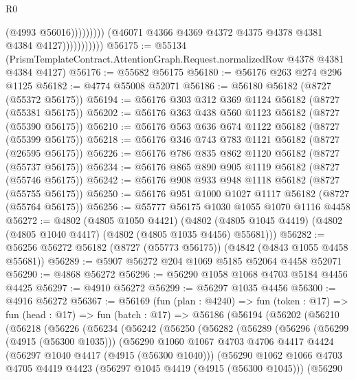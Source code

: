 \begin{lexlean}{R0}
\begin{coremodule}
                                        (@4993 @56016)))))))))
                        (@46071 @4366 @4369 @4372 @4375 @4378 @4381 @4384 @4127)))))))))))
@56175 := @55134
    (PrismTemplateContract.AttentionGraph.Request.normalizedRow @4378 @4381 @4384 @4127)
@56176 := @55682 @56175
@56180 := @56176 @263 @274 @296 @1125
@56182 := @4774 @55008 @52071
@56186 := @56180 @56182 (@8727 (@55372 @56175))
@56194 := @56176 @303 @312 @369 @1124 @56182 (@8727 (@55381 @56175))
@56202 := @56176 @363 @438 @560 @1123 @56182 (@8727 (@55390 @56175))
@56210 := @56176 @563 @636 @674 @1122 @56182 (@8727 (@55399 @56175))
@56218 := @56176 @346 @743 @783 @1121 @56182 (@8727 (@26595 @56175))
@56226 := @56176 @786 @835 @862 @1120 @56182 (@8727 (@55737 @56175))
@56234 := @56176 @865 @890 @905 @1119 @56182 (@8727 (@55746 @56175))
@56242 := @56176 @908 @933 @948 @1118 @56182 (@8727 (@55755 @56175))
@56250 := @56176 @951 @1000 @1027 @1117 @56182 (@8727 (@55764 @56175))
@56256 := @55777 @56175 @1030 @1055 @1070 @1116 @4458
@56272 := @4802
    (@4805 @1050 @4421)
    (@4802 (@4805 @1045 @4419) (@4802 (@4805 @1040 @4417) (@4802 (@4805 @1035 @4456) @55681)))
@56282 := @56256 @56272 @56182 (@8727 (@55773 @56175)) (@4842 (@4843 @1055 @4458 @55681))
@56289 := @5907 @56272 @204 @1069 @5185 @52064 @4458 @52071
@56290 := @4868 @56272
@56296 := @56290 @1058 @1068 @4703 @5184 @4456 @4425
@56297 := @4910 @56272
@56299 := @56297 @1035 @4456
@56300 := @4916 @56272
@56367 := @56169
    (fun (plan : @4240) =>
    fun (token : @17) =>
    fun (head : @17) =>
    fun (batch : @17) =>
    @56186
      (@56194
        (@56202
          (@56210
            (@56218
              (@56226
                (@56234
                  (@56242
                    (@56250
                      (@56282
                        (@56289
                          (@56296
                            (@56299 (@4915 (@56300 @1035)))
                            (@56290
                              @1060
                              @1067
                              @4703
                              @4706
                              @4417
                              @4424
                              (@56297 @1040 @4417 (@4915 (@56300 @1040)))
                              (@56290
                                @1062
                                @1066
                                @4703
                                @4705
                                @4419
                                @4423
                                (@56297 @1045 @4419 (@4915 (@56300 @1045)))
                                (@56290

\end{coremodule}
\end{lexlean}

